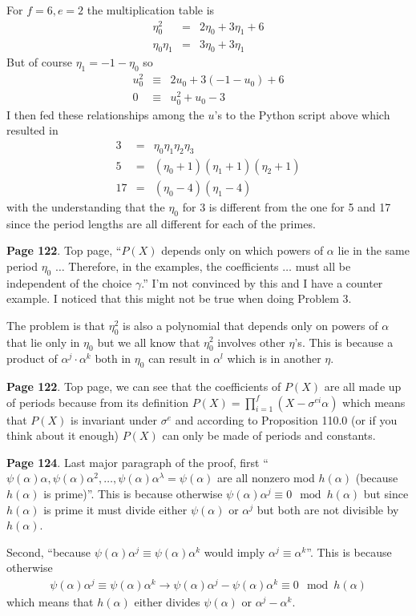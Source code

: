 \documentclass[aps,preprint,preprintnumbers,nofootinbib,showpacs,prd]{revtex4-1}
\newcommand{\nbea}{\begin{eqnarray*}}
\newcommand{\neea}{\end{eqnarray*}}
\begin{document}
For $f = 6, e = 2$ the multiplication table is
%
\nbea
\eta_0^2 & = & 2\eta_0 + 3\eta_1 + 6 \\
\eta_0\eta_1 & = & 3\eta_0 + 3\eta_1
\neea
%
But of course $\eta_1 = -1 - \eta_0$ so
%
\nbea
u_0^2 & \equiv & 2u_0 + 3(-1-u_0) + 6 \\
0 & \equiv & u_0^2 + u_0 - 3
\neea
%
I then fed these relationships among the $u$'s to the Python script above which resulted in
%
\nbea
3 & = & \eta_0 \eta_1 \eta_2 \eta_3 \\
5 & = & (\eta_0 + 1)(\eta_1 + 1)(\eta_2 + 1) \\
17 & = & (\eta_0 - 4)(\eta_1 - 4)
\neea
%
with the understanding that the $\eta_0$ for 3 is different from the one for 5 and 17 since the period lengths are all different for each of the primes.

{\bf Page 122}. Top page, ``$P(X)$ depends only on which powers of $\alpha$ lie in the same period $\eta_0$ $\dots$ Therefore, in the examples, the coefficients $\dots$ must all be independent of the choice $\gamma$.'' I'm not convinced by this and I have a counter example. I noticed that this might not be true when doing Problem 3.

The problem is that $\eta_0^2$ is also a polynomial that depends only on powers of $\alpha$ that lie only in $\eta_0$ but we all know that $\eta_0^2$ involves other $\eta$'s. This is because a product of $\alpha^j\cdot\alpha^k$ both in $\eta_0$ can result in $\alpha^l$ which is in another $\eta$.

{\bf Page 122}. Top page, we can see that the coefficients of $P(X)$ are all made up of periods because from its definition $P(X) = \prod_{i=1}^f (X - \sigma^{ei} \alpha)$ which means that $P(X)$ is invariant under $\sigma^e$ and according to Proposition 110.0 (or if you think about it enough) $P(X)$ can only be made of periods and constants.

{\bf Page 124}. Last major paragraph of the proof, first ``$\psi(\alpha)\alpha,\psi(\alpha)\alpha^2,\dots,\psi(\alpha)\alpha^\lambda = \psi(\alpha)$ are all nonzero mod $h(\alpha)$ (because $h(\alpha)$ is prime)''. This is because otherwise $\psi(\alpha)\alpha^j \equiv 0 \mod{h(\alpha)}$ but since $h(\alpha)$ is prime it must divide either $\psi(\alpha)$ or $\alpha^j$ but both are not divisible by $h(\alpha)$.

Second, ``because $\psi(\alpha)\alpha^j \equiv \psi(\alpha)\alpha^k$ would imply $\alpha^j \equiv \alpha^k$''. This is because otherwise
%
\nbea
\psi(\alpha)\alpha^j \equiv \psi(\alpha)\alpha^k \to \psi(\alpha)\alpha^j - \psi(\alpha)\alpha^k \equiv 0 \mod{h(\alpha)}
\neea
%
which means that $h(\alpha)$ either divides $\psi(\alpha)$ or $\alpha^j - \alpha^k$.
\end{document}
